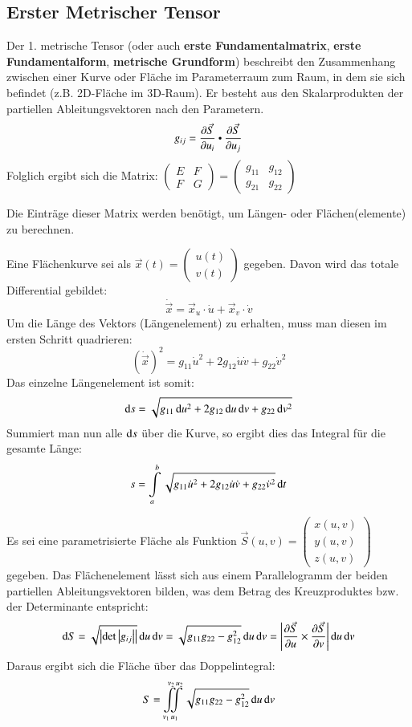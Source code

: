 \subsection{Erster Metrischer Tensor} %
Der 1. metrische Tensor (oder auch \textbf{erste Fundamentalmatrix}, \textbf{erste Fundamentalform}, \textbf{metrische Grundform})
beschreibt den Zusammenhang zwischen einer Kurve oder Fläche im Parameterraum zum Raum, in dem sie sich befindet (z.B. 2D-Fläche im 3D-Raum).
Er besteht aus den Skalarprodukten der partiellen Ableitungsvektoren nach den Parametern.
\[
    g_{ij} = \frac{\partial \vec{S}}{\partial u_i} \dotp \frac{\partial \vec{S}}{\partial u_j}
\]
Folglich ergibt sich die Matrix: $\begin{pmatrix}
    E & F\\
    F & G
\end{pmatrix} = \begin{pmatrix}
    g_{11} & g_{12}\\
    g_{21} & g_{22}
\end{pmatrix}$

Die Einträge dieser Matrix werden benötigt, um Längen- oder Flächen(elemente) zu berechnen.


Eine Flächenkurve sei als $\vec{x}(t) = \begin{pmatrix}
    u(t)\\
    v(t)
\end{pmatrix}$ gegeben.
Davon wird das totale Differential gebildet: 
\[
    \dot{\vec{x}} = \vec{x}_u \cdot \dot{u} + \vec{x}_v \cdot \dot{v}
\]
Um die Länge des Vektors (Längenelement) zu erhalten, muss man diesen im ersten Schritt quadrieren:
\[
    (\dot{\vec{x}})^2 = g_{11} \dot{u}^2 + 2 g_{12} \dot{u} \dot{v} + g_{22} \dot{v}^2
\]
Das einzelne Längenelement ist somit:
\[
    \mathop{} \! \mathrm{d} s = \sqrt{g_{11} \mathop{} \! \mathrm{d} u^2 + 2 g_{12} \mathop{} \! \mathrm{d} u \mathop{} \! \mathrm{d} v + g_{22} \mathop{} \! \mathrm{d} v^2}
\]
Summiert man nun alle $\mathop{} \! \mathrm{d} s$ über die Kurve, so ergibt dies das Integral für die gesamte Länge:
\[
    s = \int\limits_{a}^{b} \sqrt{g_{11} \dot{u}^2 + 2 g_{12} \dot{u} \dot{v} + g_{22} \dot{v}^2} \mathop{} \! \mathrm{d} t
\]


Es sei eine parametrisierte Fläche als Funktion $\vec{S}(u,v) = \begin{pmatrix}
    x(u,v)\\
    y(u,v)\\
    z(u,v)
\end{pmatrix}$ gegeben.
Das Flächenelement lässt sich aus einem Parallelogramm der beiden partiellen Ableitungsvektoren bilden, 
was dem Betrag des Kreuzproduktes bzw. der Determinante entspricht:
\[
    \mathop{} \! \mathrm{d} S = \sqrt{\left|\det\left|g_{ij}\right|\right|}\mathop{} \! \mathrm{d} u \mathop{} \! \mathrm{d} v = \sqrt{g_{11}g_{22} - g_{12}^2} \mathop{} \! \mathrm{d} u \mathop{} \! \mathrm{d} v = \left|\frac{\partial \vec{S}}{\partial u} \times \frac{\partial \vec{S}}{\partial v}\right| \mathop{} \! \mathrm{d} u \mathop{} \! \mathrm{d} v
\]
Daraus ergibt sich die Fläche über das Doppelintegral:
\[
    S = \iint\limits_{v_1\, u_1}^{v_2\, u_2} \sqrt{g_{11}g_{22} - g_{12}^2} \mathop{} \! \mathrm{d} u \mathop{} \! \mathrm{d} v
\]


